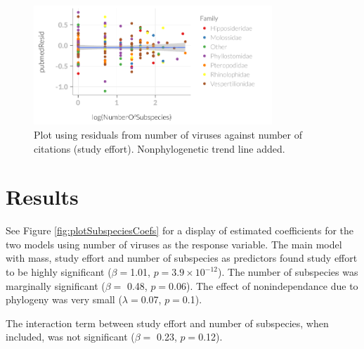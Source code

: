 \begin{knitrout}\footnotesize
{}\color{fgcolor}\begin{figure}[t]

{\centering \includegraphics[width=0.8\textwidth]{figure/pubmedresidPlot-1} 

}

\caption[Plot using residuals from number of viruses against number of citations (study effort)]{Plot using residuals from number of viruses against number of citations (study effort). Nonphylogenetic trend line added. }\label{fig:pubmedresidPlot}
\end{figure}


\end{knitrout}


\clearpage
\section{Results}


See Figure \ref{fig:plotSubspeciesCoefs} for a display of estimated coefficients for the two models using number of viruses as the response variable. 
The main model with mass, study effort and number of subspecies as predictors found study effort to be highly significant ($\beta = $1.01, $p = $\ensuremath{3.9\times 10^{-12}}). 
The number of subspecies was marginally significant ($\beta = $ 0.48, $p = $0.06). 
The effect of nonindependance due to phylogeny was very small ($\lambda = $0.07, $p = $0.1).

The interaction term between study effort and number of subspecies, when included, was not significant ($\beta = $ 0.23, $p = $0.12).


